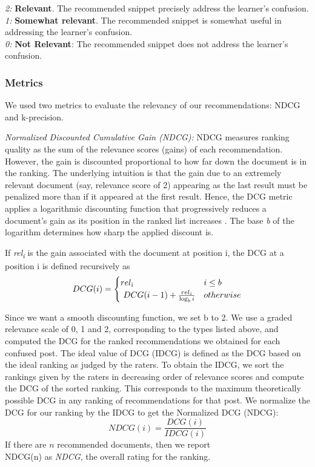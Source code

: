 \documentclass{edm_template}
\begin{document}
\textit{2:} {\bf Relevant}. The recommended snippet precisely address the learner's confusion.\\
\textit{1:} {\bf Somewhat relevant}. The recommended snippet is somewhat useful in addressing the learner's confusion.\\
\textit{0:} {\bf Not Relevant}: The recommended snippet does not address the learner's confusion.

\subsubsection{Metrics}
We used two metrics to evaluate the relevancy of our recommendations: NDCG and k-precision.

\textit{Normalized Discounted Cumulative Gain (NDCG):}
NDCG measures ranking quality as the sum of the relevance scores (gains) of each recommendation. However, the gain is discounted proportional to how far down the document is in the ranking. The underlying intuition is that the gain due to an extremely relevant document (say, relevance score of 2) appearing as the last result must be penalized more than if it appeared at the first result. Hence, the DCG metric applies a logarithmic discounting function that progressively reduces a document's gain as its position in the ranked list increases \cite{ndcgcite}. The base \textit{b} of the logarithm determines how sharp the applied discount is.

If \textit{rel\textsubscript i} is the gain associated with the document at position i, the DCG at a position i is defined recursively as
\begin{equation}
DCG(i) =
\begin{cases}
rel \textsubscript i & i \le b  \\
\ DCG(i-1) + \frac{rel_i}{\log_b{i}} & otherwise \\
\end{cases}
\end{equation}

Since we want a smooth discounting function, we set b to 2. We use a graded relevance scale of 0, 1 and 2, corresponding to the types listed above, and computed the DCG for the ranked recommendations we obtained for each confused post. The ideal value of DCG (IDCG) is defined as the DCG based on the ideal ranking as judged by the raters. To obtain the IDCG, we sort the rankings given by the raters in decreasing order of relevance scores and compute the DCG of the sorted ranking. This corresponds to the maximum theoretically possible DCG in any ranking of recommendations for that post. We normalize the DCG for our ranking by the IDCG to get the Normalized DCG (NDCG):
\begin{equation}
NDCG(i) = \frac{DCG(i)}{IDCG(i)}
\end{equation}
If there are $n$ recommended documents, then we report\\NDCG(n) as \emph{NDCG}, the overall rating for the ranking. 
\end{document}
